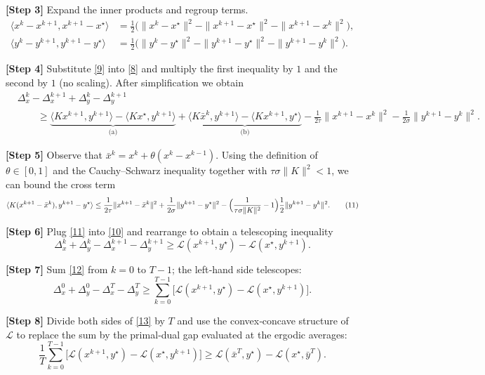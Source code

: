 \documentclass{article}
\begin{document}
\noindent\textbf{[Step 3]}  Expand the inner products and regroup terms.
\[
\begin{aligned}
\langle x^{k}-x^{k+1},x^{k+1}-x^{\star}\rangle
&=\tfrac12\big(\|x^{k}-x^{\star}\|^{2}-\|x^{k+1}-x^{\star}\|^{2}-\|x^{k+1}-x^{k}\|^{2}\big),\\
\langle y^{k}-y^{k+1},y^{k+1}-y^{\star}\rangle
&=\tfrac12\big(\|y^{k}-y^{\star}\|^{2}-\|y^{k+1}-y^{\star}\|^{2}-\|y^{k+1}-y^{k}\|^{2}\big).
\end{aligned}
\tag{9}
\]

\noindent\textbf{[Step 4]}  Substitute \eqref{9} into \eqref{8} and multiply the first inequality by $1$ and the second by $1$ (no scaling). After simplification we obtain
\[
\begin{aligned}
&\Delta_{x}^{k}-\Delta_{x}^{k+1}+\Delta_{y}^{k}-\Delta_{y}^{k+1}\\
&\qquad\ge
\underbrace{\langle Kx^{k+1},y^{k+1}\rangle-\langle Kx^{\star},y^{k+1}\rangle}_{\text{(a)}}
+\underbrace{\langle K\bar x^{k},y^{k+1}\rangle-\langle Kx^{k+1},y^{\star}\rangle}_{\text{(b)}}
-\frac{1}{2\tau}\|x^{k+1}-x^{k}\|^{2}
-\frac{1}{2\sigma}\|y^{k+1}-y^{k}\|^{2}.
\end{aligned}
\tag{10}
\]

\noindent\textbf{[Step 5]}  Observe that $\bar x^{k}=x^{k}+\theta(x^{k}-x^{k-1})$. Using the definition of $\theta\in[0,1]$ and the Cauchy–Schwarz inequality together with $\tau\sigma\|K\|^{2}<1$, we can bound the cross term
\[
\langle K(x^{k+1}-\bar x^{k}),y^{k+1}-y^{\star}\rangle
\le
\frac{1}{2\tau}\|x^{k+1}-\bar x^{k}\|^{2}
+\frac{1}{2\sigma}\|y^{k+1}-y^{\star}\|^{2}
-\Bigl(\frac{1}{\tau\sigma\|K\|^{2}}-1\Bigr)\frac{1}{2}\|y^{k+1}-y^{k}\|^{2}.
\tag{11}
\]

\noindent\textbf{[Step 6]}  Plug \eqref{11} into \eqref{10} and rearrange to obtain a telescoping inequality
\[
\Delta_{x}^{k}+\Delta_{y}^{k}
-\Delta_{x}^{k+1}-\Delta_{y}^{k+1}
\ge
\mathcal L(x^{k+1},y^{\star})-\mathcal L(x^{\star},y^{k+1}) .
\tag{12}
\]

\noindent\textbf{[Step 7]}  Sum \eqref{12} from $k=0$ to $T-1$; the left‑hand side telescopes:
\[
\Delta_{x}^{0}+\Delta_{y}^{0}
-\Delta_{x}^{T}-\Delta_{y}^{T}
\ge
\sum_{k=0}^{T-1}\big[\mathcal L(x^{k+1},y^{\star})-\mathcal L(x^{\star},y^{k+1})\big].
\tag{13}
\]

\noindent\textbf{[Step 8]}  Divide both sides of \eqref{13} by $T$ and use the convex‑concave structure of $\mathcal L$ to replace the sum by the primal‑dual gap evaluated at the ergodic averages:
\[
\frac{1}{T}\sum_{k=0}^{T-1}\big[\mathcal L(x^{k+1},y^{\star})-\mathcal L(x^{\star},y^{k+1})\big]
\ge
\mathcal L(\bar x^{T},y^{\star})-\mathcal L(x^{\star},\bar y^{T}) .
\tag{14}
\]
\end{document}
